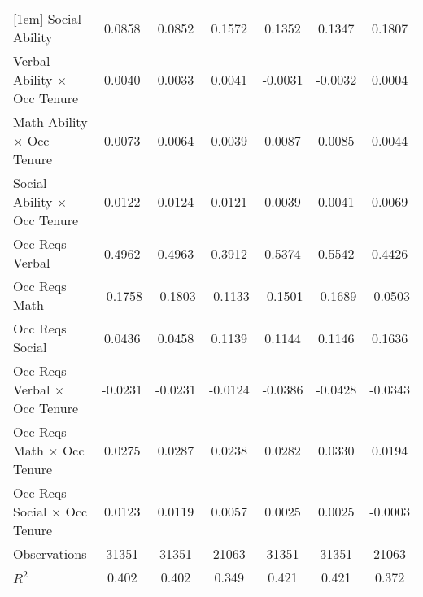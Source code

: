 {\begin{tabular}{l*{6}{c}}
[1em]
Social Ability      &      0.0858\sym{***}&      0.0852\sym{***}&      0.1572\sym{***}&      0.1352\sym{***}&      0.1347\sym{***}&      0.1807\sym{***}\\
[1em]
Verbal Ability $\times$ Occ Tenure&      0.0040         &      0.0033         &      0.0041         &     -0.0031         &     -0.0032         &      0.0004         \\
[1em]
Math Ability $\times$ Occ Tenure&      0.0073         &      0.0064         &      0.0039         &      0.0087\sym{**} &      0.0085\sym{**} &      0.0044         \\
[1em]
Social Ability $\times$ Occ Tenure&      0.0122\sym{***}&      0.0124\sym{***}&      0.0121\sym{***}&      0.0039\sym{*}  &      0.0041\sym{*}  &      0.0069\sym{**} \\
[1em]
Occ Reqs Verbal     &      0.4962\sym{***}&      0.4963\sym{***}&      0.3912\sym{***}&      0.5374\sym{***}&      0.5542\sym{***}&      0.4426\sym{***}\\
[1em]
Occ Reqs Math       &     -0.1758\sym{**} &     -0.1803\sym{**} &     -0.1133         &     -0.1501\sym{**} &     -0.1689\sym{**} &     -0.0503         \\
[1em]
Occ Reqs Social     &      0.0436         &      0.0458         &      0.1139\sym{***}&      0.1144\sym{***}&      0.1146\sym{***}&      0.1636\sym{***}\\
[1em]
Occ Reqs Verbal $\times$ Occ Tenure&     -0.0231\sym{*}  &     -0.0231\sym{*}  &     -0.0124         &     -0.0386\sym{***}&     -0.0428\sym{***}&     -0.0343\sym{**} \\
[1em]
Occ Reqs Math $\times$ Occ Tenure&      0.0275\sym{**} &      0.0287\sym{***}&      0.0238         &      0.0282\sym{***}&      0.0330\sym{***}&      0.0194         \\
[1em]
Occ Reqs Social $\times$ Occ Tenure&      0.0123\sym{***}&      0.0119\sym{***}&      0.0057         &      0.0025         &      0.0025         &     -0.0003         \\
\hline  
Observations        &       31351         &       31351         &       21063         &       31351         &       31351         &       21063         \\
\(R^{2}\)           &       0.402         &       0.402         &       0.349         &       0.421         &       0.421         &       0.372         \\
\hline  
\end{tabular}
}
